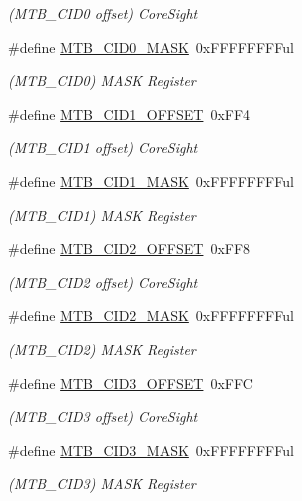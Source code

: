 \begin{DoxyCompactItemize}
$$\begin{DoxyCompactList}\small\item\em (M\+T\+B\+\_\+\+C\+I\+D0 offset) Core\+Sight \end{DoxyCompactList}\item 
\#define \mbox{\hyperlink{group___s_a_m_d21___m_t_b_ga9e7f0e674b34967de0b0f12095baa2fe}{M\+T\+B\+\_\+\+C\+I\+D0\+\_\+\+M\+A\+SK}}~0x\+F\+F\+F\+F\+F\+F\+F\+Ful
\begin{DoxyCompactList}\small\item\em (M\+T\+B\+\_\+\+C\+I\+D0) M\+A\+SK Register \end{DoxyCompactList}\item 
\#define \mbox{\hyperlink{group___s_a_m_d21___m_t_b_ga3472f9c9e1f0a1661aba5ef3337ba1e5}{M\+T\+B\+\_\+\+C\+I\+D1\+\_\+\+O\+F\+F\+S\+ET}}~0x\+F\+F4
\begin{DoxyCompactList}\small\item\em (M\+T\+B\+\_\+\+C\+I\+D1 offset) Core\+Sight \end{DoxyCompactList}\item 
\#define \mbox{\hyperlink{group___s_a_m_d21___m_t_b_gab04ffc43b8ff46bbec4d124cfbe309e7}{M\+T\+B\+\_\+\+C\+I\+D1\+\_\+\+M\+A\+SK}}~0x\+F\+F\+F\+F\+F\+F\+F\+Ful
\begin{DoxyCompactList}\small\item\em (M\+T\+B\+\_\+\+C\+I\+D1) M\+A\+SK Register \end{DoxyCompactList}\item 
\#define \mbox{\hyperlink{group___s_a_m_d21___m_t_b_ga478c06e0d8728bf541a09d9cf376d90d}{M\+T\+B\+\_\+\+C\+I\+D2\+\_\+\+O\+F\+F\+S\+ET}}~0x\+F\+F8
\begin{DoxyCompactList}\small\item\em (M\+T\+B\+\_\+\+C\+I\+D2 offset) Core\+Sight \end{DoxyCompactList}\item 
\#define \mbox{\hyperlink{group___s_a_m_d21___m_t_b_ga669c770fd44f285415b226ec5d3a7baa}{M\+T\+B\+\_\+\+C\+I\+D2\+\_\+\+M\+A\+SK}}~0x\+F\+F\+F\+F\+F\+F\+F\+Ful
\begin{DoxyCompactList}\small\item\em (M\+T\+B\+\_\+\+C\+I\+D2) M\+A\+SK Register \end{DoxyCompactList}\item 
\#define \mbox{\hyperlink{group___s_a_m_d21___m_t_b_gac81a28a777cce5ef1678c92438d75ebe}{M\+T\+B\+\_\+\+C\+I\+D3\+\_\+\+O\+F\+F\+S\+ET}}~0x\+F\+FC
\begin{DoxyCompactList}\small\item\em (M\+T\+B\+\_\+\+C\+I\+D3 offset) Core\+Sight \end{DoxyCompactList}\item 
\#define \mbox{\hyperlink{group___s_a_m_d21___m_t_b_ga1e712ff567cb3de2c31b02bff55545b0}{M\+T\+B\+\_\+\+C\+I\+D3\+\_\+\+M\+A\+SK}}~0x\+F\+F\+F\+F\+F\+F\+F\+Ful
\begin{DoxyCompactList}\small\item\em (M\+T\+B\+\_\+\+C\+I\+D3) M\+A\+SK Register \end{DoxyCompactList}\end{DoxyCompactItemize}


